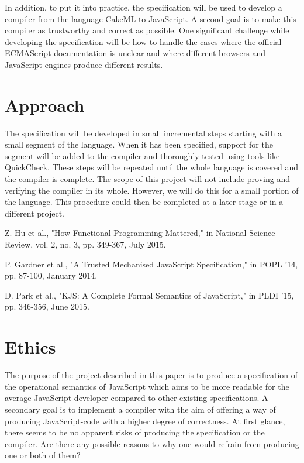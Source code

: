 \documentclass [11pt]{article}
\begin{document}
In addition, to put it into practice, the specification will be used to develop a compiler from the language CakeML to JavaScript. A second goal is to make this compiler as trustworthy and correct as possible. One significant challenge while developing the specification will be how to handle the cases where the official ECMAScript-documentation is unclear and where different browsers and JavaScript-engines produce different results.
 
\section{Approach}
The specification will be developed in small incremental steps starting with a small segment of the language. When it has been specified, support for the segment will be added to the compiler and thoroughly tested using tools like QuickCheck. These steps will be repeated until the whole language is covered and the compiler is complete. The scope of this project will not include proving and verifying the compiler in its whole. However, we will do this for a small portion of the language. This procedure could then be completed at a later stage or in a different project.
\nocite{*}
\begin{thebibliography}{1}

Z. Hu et al., "How Functional Programming Mattered," in National Science Review, vol. 2, no. 3, pp. 349-367, July 2015.	

P. Gardner et al., "A Trusted Mechanised JavaScript Specification," in POPL ’14, pp. 87-100, January 2014.	

D. Park et al., "KJS: A Complete Formal Semantics of JavaScript," in PLDI '15, pp. 346-356, June 2015.	

\end{thebibliography}

\appendix
\section{Ethics}
The purpose of the project described in this paper is to produce a specification of the operational semantics of JavaScript which aims to be more readable for the average JavaScript developer compared to other existing specifications. A secondary goal is to implement a compiler with the aim of offering a way of producing JavaScript-code with a higher degree of correctness. At first glance, there seems to be no apparent risks of producing the specification or the compiler. Are there any possible reasons to why one would refrain from producing one or both of them?
\end{document}
